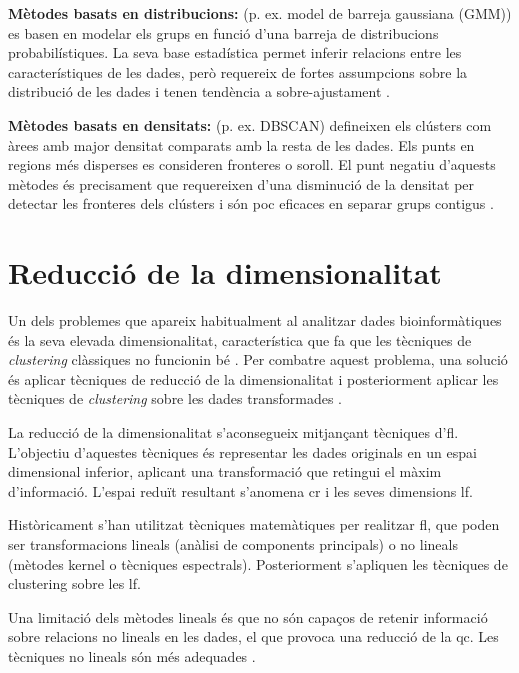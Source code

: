 \documentclass[CAT,BIB]{TFUOC}%
\begin{document}
        \textbf{Mètodes basats en distribucions:} (p. ex. model de barreja gaussiana (GMM)) es basen en modelar els grups en funció d'una barreja de distribucions probabilístiques. La seva base estadística permet inferir relacions entre les característiques de les dades, però requereix de fortes assumpcions sobre la distribució de les dades i tenen tendència a sobre-ajustament \citep{Karim2021}.

        \textbf{Mètodes basats en densitats:} (p. ex. DBSCAN) defineixen els clústers com àrees amb major densitat comparats amb la resta de les dades. Els punts en regions més disperses es consideren fronteres o soroll. El punt negatiu d'aquests mètodes és precisament que requereixen d'una disminució de la densitat per detectar les fronteres dels clústers i són poc eficaces en separar grups contigus \citep{Karim2021}.

    \section{Reducció de la dimensionalitat}
    \label{s:state_reduccio}

        Un dels problemes que apareix habitualment al analitzar dades bioinformàtiques és la seva elevada dimensionalitat, característica que fa que les tècniques de \textit{clustering} clàssiques no funcionin bé \citep{Masood2015, Karim2021}. Per combatre aquest problema, una solució és aplicar tècniques de reducció de la dimensionalitat i posteriorment aplicar les tècniques de \textit{clustering} sobre les dades transformades \citep{Min2018, Masood2015}.

        La reducció de la dimensionalitat s'aconsegueix mitjançant tècniques d'\gls{fl}. L'objectiu d'aquestes tècniques és representar les dades originals en un espai dimensional inferior, aplicant una transformació que retingui el màxim d'informació. L'espai reduït resultant s'anomena \gls{cr} i les seves dimensions \gls{lf}.

        Històricament s'han utilitzat tècniques matemàtiques per realitzar \gls{fl}, que poden ser transformacions lineals (anàlisi de components principals) o no lineals (mètodes kernel o tècniques espectrals). Posteriorment s'apliquen les tècniques de clustering sobre les \gls{lf}.

        Una limitació dels mètodes lineals és que no són capaços de retenir informació sobre relacions no lineals en les dades, el que provoca una reducció de la \gls{qc}. Les tècniques no lineals són més adequades \citep{Karim2021}.
\end{document}

